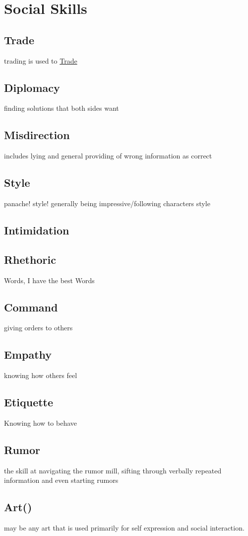 \section{Social Skills}\label{sec:social-skills}
\subsection{Trade}\label{subsec:trade}
trading is used to \hyperref[ch:trade]{Trade}
\subsection{Diplomacy}\label{subsec:diplomacy}
finding solutions that both sides want
\subsection{Misdirection}\label{subsec:misdirection}
includes lying and general providing of wrong information as correct
\subsection{Style}\label{subsec:style}
panache!
style!
generally being impressive/following characters style
\subsection{Intimidation}\label{subsec:intimidation}
\subsection{Rhethoric}\label{subsec:rhethoric}
Words, I have the best Words
\subsection{Command}\label{subsec:command}
giving orders to others
\subsection{Empathy}\label{subsec:empathy}
knowing how others feel
\subsection{Etiquette}\label{subsec:etiquette}
Knowing how to behave
\subsection{Rumor}\label{subsec:rumor}
the skill at navigating the rumor mill, sifting through verbally repeated information and even starting rumors
\subsection{Art()}\label{subsec:art}
may be any art that is used primarily for self expression and social interaction.
